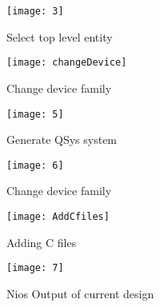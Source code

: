 \begin{figure}[!h]
	\centering
	\texttt{[image: 3]}
	\caption{Select top level entity}
	\label{fig:select_top_ent}
\end{figure}

\begin{figure}[!h]
	\centering
	\texttt{[image: changeDevice]}
	\caption{Change device family}
	\label{fig:changeDevice}
\end{figure}

\begin{figure}[!h]
	\centering
	\texttt{[image: 5]}
	\caption{Generate QSys system}
	\label{fig:generate_system}
\end{figure}

\begin{figure}[!h]
	\centering
	\texttt{[image: 6]}
	\caption{Change device family}
	\label{fig:add_qsys_sys}
\end{figure}

\begin{figure}[!h]
	\centering
	\texttt{[image: AddCfiles]}
	\caption{Adding C files}
	\label{fig:AddCfiles}
\end{figure}

\begin{figure}[!h]
	\centering
	\texttt{[image: 7]}
	\caption{Nios Output of current design}
	\label{fig:Final_adder_out}
\end{figure}



